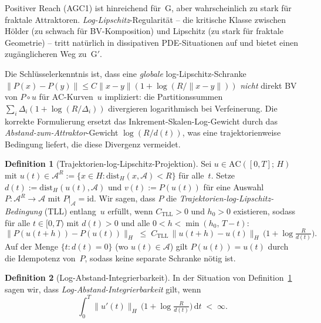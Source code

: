 \documentclass[12pt,a4paper]{article}
\theoremstyle{definition}
\newtheorem{definition}{Definition}[section]
\theoremstyle{plain}
\theoremstyle{remark}
\begin{document}
Positiver Reach (AGC1) ist hinreichend für~G, aber wahrscheinlich zu stark für
fraktale Attraktoren. \emph{Log-Lipschitz}-Regularität -- die kritische
Klasse zwischen H\"older (zu schwach für BV-Komposition) und Lipschitz
(zu stark für fraktale Geometrie) -- tritt natürlich in dissipativen
PDE-Situationen auf und bietet einen zugänglicheren Weg zu~G$'$.

Die Schlüsselerkenntnis ist, dass eine \emph{globale} log-Lipschitz-Schranke
$\|P(x)-P(y)\| \le C\|x-y\|(1+\log(R/\|x-y\|))$
\emph{nicht} direkt BV von $P\circ u$ für AC-Kurven~$u$ impliziert:
die Partitionssummen $\sum_i \Delta_i(1+\log(R/\Delta_i))$ divergieren
logarithmisch bei Verfeinerung. Die korrekte Formulierung ersetzt das
Inkrement-Skalen-Log-Gewicht durch das
\emph{Abstand-zum-Attraktor}-Gewicht $\log(R/d(t))$, was eine
trajektorienweise Bedingung liefert, die diese Divergenz vermeidet.

\begin{definition}[Trajektorien-log-Lipschitz-Projektion]
\label{def:TLL}
Sei $u \in \mathrm{AC}([0,T];\,H)$ mit $u(t) \in \mathcal{A}^R
:= \{x \in H : \mathrm{dist}_H(x,\mathcal{A}) < R\}$ für alle~$t$.
Setze $d(t) := \mathrm{dist}_H(u(t),\mathcal{A})$ und
$v(t) := P(u(t))$ für eine Auswahl
$P: \mathcal{A}^R \to \mathcal{A}$ mit $P|_{\mathcal{A}} = \mathrm{id}$.
Wir sagen, dass $P$ die \emph{Trajektorien-log-Lipschitz-Bedingung} (TLL) entlang~$u$ erfüllt, wenn $C_{\mathrm{TLL}} > 0$ und
$h_0 > 0$ existieren, sodass für alle $t \in [0,T)$ mit $d(t) > 0$ und
alle $0 < h < \min(h_0,\, T-t)$:
\begingroup
\renewcommand{\theequation}{TLL}
\renewcommand{\theHequation}{TLL}
\begin{equation}\label{eq:TLL}
  \|P(u(t\!+\!h)) - P(u(t))\|_H
  \;\le\;
  C_{\mathrm{TLL}}\,\|u(t\!+\!h) - u(t)\|_H\,
  \bigl(1 + \log\tfrac{R}{d(t)}\bigr).
\end{equation}
\endgroup
Auf der Menge $\{t : d(t)=0\}$ (wo $u(t) \in \mathcal{A}$) gilt
$P(u(t)) = u(t)$ durch die Idempotenz von~$P$, sodass keine separate Schranke
nötig ist.
\end{definition}

\begin{definition}[Log-Abstand-Integrierbarkeit]
\label{def:LDI}
In der Situation von Definition~\ref{def:TLL} sagen wir, dass
\emph{Log-Abstand-Integrierbarkeit} gilt, wenn
\begingroup
\renewcommand{\theequation}{LDI}
\renewcommand{\theHequation}{LDI}
\begin{equation}\label{eq:LDI}
  \int_0^T \|u'(t)\|_H\,
  \bigl(1 + \log\tfrac{R}{d(t)}\bigr)\,\mathrm{d}t
  \;<\; \infty.
\end{equation}
\endgroup
\end{definition}
\end{document}
